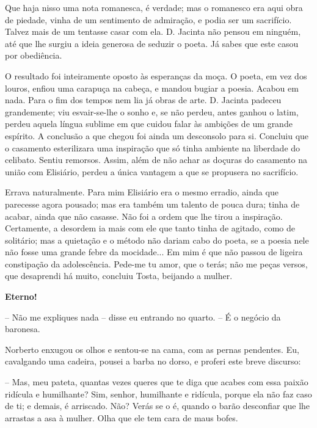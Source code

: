 Que haja nisso uma nota romanesca, é verdade; mas o romanesco era aqui
obra de piedade, vinha de um sentimento de admiração, e podia ser um
sacrifício. Talvez mais de um tentasse casar com ela. D. Jacinta não
pensou em ninguém, até que lhe surgiu a ideia generosa de seduzir o
poeta. Já sabes que este casou por obediência.

O resultado foi inteiramente oposto às esperanças da moça. O poeta, em
vez dos louros, enfiou uma carapuça na cabeça, e mandou bugiar a poesia.
Acabou em nada. Para o fim dos tempos nem lia já obras de arte. D.
Jacinta padeceu grandemente; viu esvair-se-lhe o sonho e, se não perdeu,
antes ganhou o latim, perdeu aquela língua sublime em que cuidou falar
às ambições de um grande espírito. A conclusão a que chegou foi ainda um
desconsolo para si. Concluiu que o casamento esterilizara uma inspiração
que só tinha ambiente na liberdade do celibato. Sentiu remorsos. Assim,
além de não achar as doçuras do casamento na união com Elisiário, perdeu
a única vantagem a que se propusera no sacrifício.

Errava naturalmente. Para mim Elisiário era o mesmo erradio, ainda que
parecesse agora pousado; mas era também um talento de pouca dura; tinha
de acabar, ainda que não casasse. Não foi a ordem que lhe tirou a
inspiração. Certamente, a desordem ia mais com ele que tanto tinha de
agitado, como de solitário; mas a quietação e o método não dariam cabo
do poeta, se a poesia nele não fosse uma grande febre da mocidade... Em
mim é que não passou de ligeira constipação da adolescência. Pede-me tu
amor, que o terás; não me peças versos, que desaprendi há muito,
concluiu Tosta, beijando a mulher.

\textbf{Eterno!}

-- Não me expliques nada -- disse eu entrando no quarto. -- É o negócio
da baronesa.

Norberto enxugou os olhos e sentou-se na cama, com as pernas pendentes.
Eu, cavalgando uma cadeira, pousei a barba no dorso, e proferi este
breve discurso:

-- Mas, meu pateta, quantas vezes queres que te diga que acabes com essa
paixão ridícula e humilhante? Sim, senhor, humilhante e ridícula, porque
ela não faz caso de ti; e demais, é arriscado. Não? Verás se o é, quando
o barão desconfiar que lhe arrastas a asa à mulher. Olha que ele tem
cara de maus bofes.

